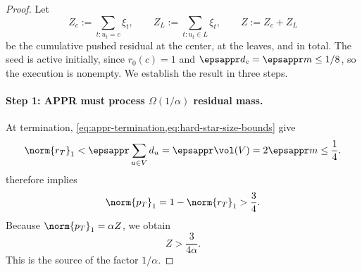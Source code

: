 \begin{proof}
Let
\begin{equation}
    Z_c:=\sum_{t:u_t=c}\xi_t,
    \qquad
    Z_L:=\sum_{t:u_t\in L}\xi_t,
    \qquad
    Z:=Z_c+Z_L
    \label{eq:appr-cumulative-masses}
\end{equation}
be the cumulative pushed residual at the center, at the leaves, and in total.
The seed is active initially, since \(r_0(c)=1\) and
\(\epsappr d_c=\epsappr m\leq1/8\), so the execution is nonempty. We establish
the result in three steps.

\paragraph{Step 1: APPR must process \(\Omega(1/\alpha)\) residual mass.}
At termination, \cref{eq:appr-termination,eq:hard-star-size-bounds} give
\begin{equation}
    \norm{r_T}_1
    <\epsappr\sum_{u\in V}d_u
    =\epsappr\vol(V)
    =2\epsappr m
    \leq\frac14.
    \label{eq:appr-star-terminal-residual}
\end{equation}
 therefore implies
\begin{equation}
    \norm{p_T}_1
    =1-\norm{r_T}_1
    >\frac34.
    \label{eq:appr-star-settled-mass}
\end{equation}
Because \(\norm{p_T}_1=\alpha Z\), we obtain
\begin{equation}
    Z>\frac{3}{4\alpha}.
    \label{eq:appr-star-total-pushed-mass}
\end{equation}
This is the source of the factor \(1/\alpha\).


\end{proof}

